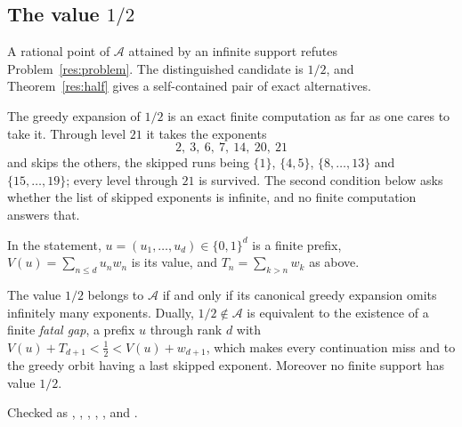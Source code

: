 \documentclass[11pt]{article}
\newcommand{\wgt}[1]{w_{#1}}
\newcommand{\Ach}{\mathcal A}
\begin{document}
\subsection{The value \texorpdfstring{$1/2$}{1/2}}

A rational point of $\Ach$ attained by an infinite support refutes
Problem~\ref{res:problem}.  The distinguished candidate is $1/2$, and
Theorem~\ref{res:half} gives a self-contained pair of exact alternatives.

The greedy expansion of $1/2$ is an exact finite computation as far as one
cares to take it.  Through level $21$ it takes the exponents
\[
  2,\ 3,\ 6,\ 7,\ 14,\ 20,\ 21
\]
and skips the others, the skipped runs being $\{1\}$, $\{4,5\}$,
$\{8,\dots,13\}$ and $\{15,\dots,19\}$; every level through $21$ is survived.
The second condition below asks whether the list of skipped exponents is
infinite, and no finite computation answers that.

In the statement, $u=(u_1,\dots,u_d)\in\{0,1\}^{d}$ is a finite prefix,
$V(u)=\sum_{n\le d}u_n\wgt n$ is its value, and $T_n=\sum_{k>n}\wgt k$ as
above.

\begin{theorem}\label{res:half}
The value $1/2$ belongs to $\Ach$ if and only if its canonical greedy
expansion omits infinitely many exponents.  Dually, $1/2\notin\Ach$ is
equivalent to the existence of a finite \emph{fatal gap}, a prefix $u$
through rank $d$ with
$V(u)+T_{d+1}<\tfrac12<V(u)+\wgt{d+1}$, which makes every continuation miss
and to the greedy orbit having a last skipped exponent.
Moreover no finite support has value $1/2$.
\end{theorem}

\noindent Checked as
,
,
,
,
,
and
.
\end{document}

